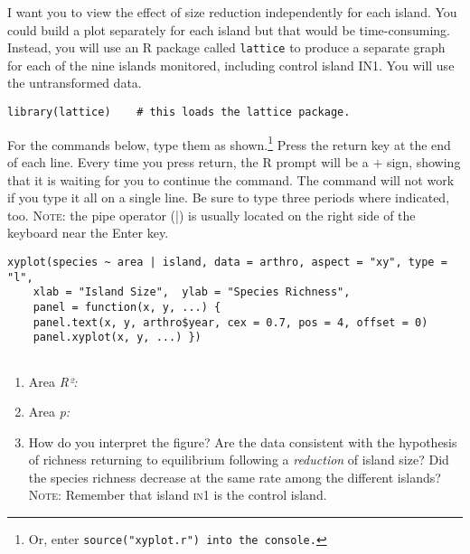 \documentclass[11pt]{article}
\begin{document}
I want you to view the effect of size reduction independently for each island.  You could build a plot separately for each island but that would be time-consuming.  Instead, you will use an R package called \texttt{lattice} to produce a separate graph for each of the nine islands monitored, including control island IN1. You will use the untransformed data.


\begin{verbatim}
library(lattice)	# this loads the lattice package.
\end{verbatim}


For the commands below, type them as shown.\footnote{Or, enter \texttt{source("xyplot.r") into the console.}} Press the return key at the end of each line. Every time you press return, the R prompt will be a $+$ sign, showing that it is waiting for you to continue the command.  The command will not work if you type it all on a single line. Be sure to type three periods where indicated, too. \textsc{Note:} the pipe operator (|) is usually located on the right side of the keyboard near the Enter key.

\begin{verbatim}
xyplot(species ~ area | island, data = arthro, aspect = "xy", type = "l", 
    xlab = "Island Size",  ylab = "Species Richness", 
    panel = function(x, y, ...) {
    panel.text(x, y, arthro$year, cex = 0.7, pos = 4, offset = 0)
    panel.xyplot(x, y, ...) })
    
\end{verbatim}

\begin{enumerate}[resume]
	\item  Area \textit{R²:} 
	
	\item Area \textit{p:}
	
	\item How do you interpret the figure? Are the data consistent with the hypothesis of richness returning to equilibrium following a \textit{reduction} of island size? Did the species richness decrease at the same rate among the different islands? \textsc{Note:} Remember that island \textsc{in1} is the control island.
	
\end{enumerate}
\end{document}
